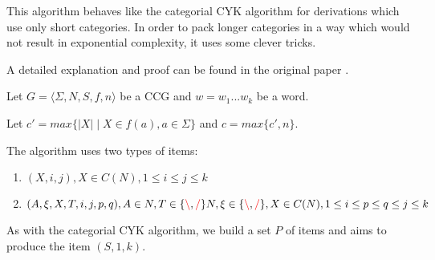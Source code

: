 \documentclass[main.tex]{subfiles}
\begin{document}
This algorithm behaves like the categorial CYK algorithm for derivations which use only
short categories. In order to pack longer categories in a way which would not
result in exponential complexity, it uses some clever tricks.

A detailed explanation and proof can be found in the original paper \cite{shanker}.

Let $ G = \langle \Sigma, N, S, f, n \rangle $ be a CCG and $w = w_1 ... w_k$
be a word.

Let $c' = max \{ |X| \mid X \in f(a), a \in \Sigma \}$ and $c = max \{ c', n \}$.

The algorithm uses two types of items:
\begin{enumerate}
    \item $(X, i, j), X \in C(N), 1 \leq i \leq j \leq k$
    \item $(A, \xi, X, T, i, j, p, q), A \in N, T \in \{ \textcolor{red}{\backslash}, \textcolor{red}{/} \} N, \xi \in \{ \textcolor{red}{\backslash}, \textcolor{red}{/} \}, X \in C(N), 1 \leq i \leq p \leq q \leq j \leq k$
\end{enumerate}

As with the categorial CYK algorithm, we build a set ${P}$ of items and aims to produce the item
$(S, 1, k)$.
\end{document}
